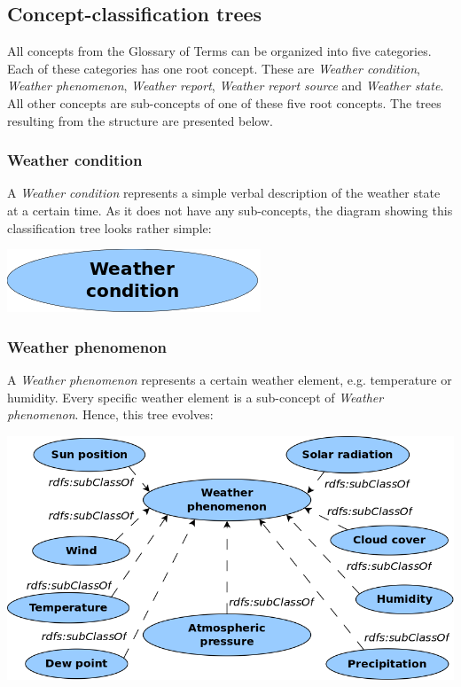 \subsection{Concept-classification trees}
\label{sec:concept_classification_trees}

All concepts from the Glossary of Terms can be organized into five categories. Each of these categories has one root concept. These are \emph{Weather condition}, \emph{Weather phenomenon}, \emph{Weather report}, \emph{Weather report source} and \emph{Weather state}. All other concepts are sub-concepts of one of these five root concepts. The trees resulting from the structure are presented below.

\subsubsection{Weather condition}

A \emph{Weather condition} represents a simple verbal description of the weather state at a certain time. As it does not have any sub-concepts, the diagram showing this classification tree looks rather simple:

\begin{center}
  \includegraphics[scale=.3]{figures/diagrams/weather-condition.png}
\end{center}

\subsubsection{Weather phenomenon}

A \emph{Weather phenomenon} represents a certain weather element, e.g. temperature or humidity. Every specific weather element is a sub-concept of \emph{Weather phenomenon}. Hence, this tree evolves:

\begin{center}
  \includegraphics[scale=.3]{figures/diagrams/weather-phenomenon.png}
\end{center}

